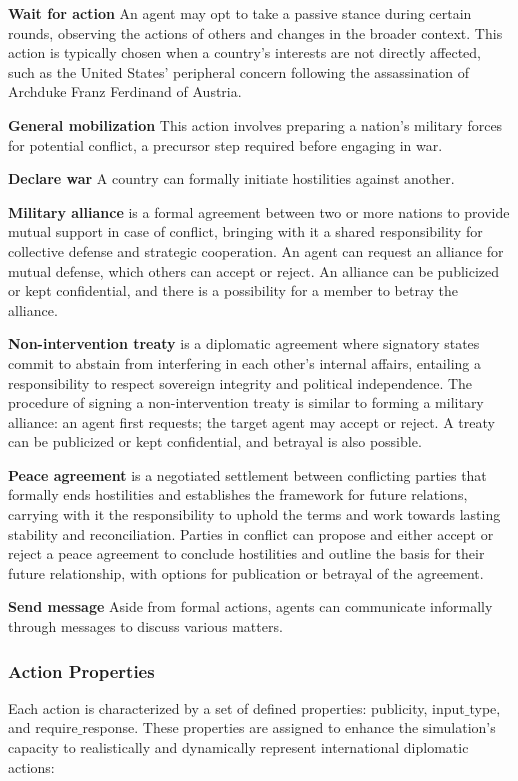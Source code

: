 \documentclass{article}
\begin{document}
\textbf{Wait for action} An agent may opt to take a passive stance during certain rounds, observing the actions of others and changes in the broader context. This action is typically chosen when a country's interests are not directly affected, such as the United States' peripheral concern following the assassination of Archduke Franz Ferdinand of Austria.

\textbf{General mobilization} This action involves preparing a nation's military forces for potential conflict, a precursor step required before engaging in war.

\textbf{Declare war} A country can formally initiate hostilities against another.

\textbf{Military alliance} is a formal agreement between two or more nations to provide mutual support in case of conflict, bringing with it a shared responsibility for collective defense and strategic cooperation. An agent can request an alliance for mutual defense, which others can accept or reject. An alliance can be publicized or kept confidential, and there is a possibility for a member to betray the alliance.

\textbf{Non-intervention treaty} is a diplomatic agreement where signatory states commit to abstain from interfering in each other's internal affairs, entailing a responsibility to respect sovereign integrity and political independence. The procedure of signing a non-intervention treaty is similar to forming a military alliance: an agent first requests; the target agent may accept or reject. A treaty can be publicized or kept confidential, and betrayal is also possible.

\textbf{Peace agreement} is a negotiated settlement between conflicting parties that formally ends hostilities and establishes the framework for future relations, carrying with it the responsibility to uphold the terms and work towards lasting stability and reconciliation. Parties in conflict can propose and either accept or reject a peace agreement to conclude hostilities and outline the basis for their future relationship, with options for publication or betrayal of the agreement.

\textbf{Send message} Aside from formal actions, agents can communicate informally through messages to discuss various matters.

\subsubsection{Action Properties}
Each action is characterized by a set of defined properties: publicity, input$\_$type, and require$\_$response. These properties are assigned to enhance the simulation's capacity to realistically and dynamically represent international diplomatic actions:
\end{document}
